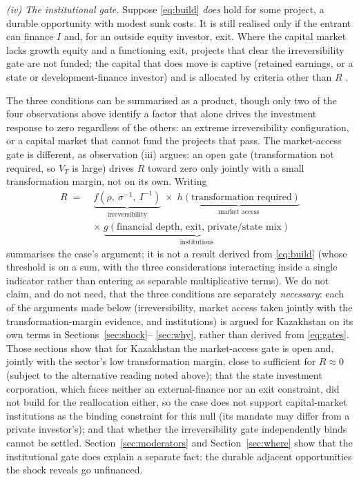 \documentclass[12pt]{article}
\begin{document}
\emph{(iv) The institutional gate.} Suppose \eqref{eq:build} \emph{does} hold for some
project, a durable opportunity with modest sunk costs. It is still realised only if the
entrant can finance $I$ and, for an outside equity investor, exit. Where the capital market
lacks growth equity and a functioning exit, projects that clear the irreversibility gate are
not funded; the capital that does move is captive (retained earnings, or a state or
development-finance investor) and is allocated by criteria other than $R$
\citep{khanna1997,khannapalepu2000,rajanzingales1998}.

The three conditions can be summarised as a product, though only two of the four observations
above identify a factor that alone drives the investment response to zero regardless of the
others: an extreme irreversibility configuration, or a capital market that cannot fund the
projects that pass. The market-access gate is different, as observation (iii) argues: an open
gate (transformation not required, so $V_T$ is large) drives $R$ toward zero only jointly with
a small transformation margin, not on its own. Writing
\begin{equation}
\begin{aligned}
R \;=\;& \underbrace{f\!\left(\rho,\ \sigma^{-1},\ I^{-1}\right)}_{\text{irreversibility}}
\;\times\; \underbrace{h(\text{transformation required})}_{\text{market access}} \\[2pt]
&\times\; \underbrace{g(\text{financial depth, exit, private/state mix})}_{\text{institutions}}
\end{aligned}
\label{eq:gates}
\end{equation}
summarises the case's argument; it is not a result derived from \eqref{eq:build} (whose
threshold is on a sum, with the three considerations interacting inside a single indicator
rather than entering as separable multiplicative terms). We do not claim, and do not need,
that the three conditions are separately \emph{necessary}: each of the arguments made below (irreversibility, market access taken jointly with the transformation-margin evidence, and
institutions) is argued for Kazakhstan on its own terms in Sections~\ref{sec:shock}--%
\ref{sec:why}, rather than derived from \eqref{eq:gates}. Those sections show that for
Kazakhstan the market-access gate is open and, jointly with the sector's low transformation
margin, close to sufficient for $R \approx 0$ (subject to the alternative reading noted above);
that the state investment corporation, which faces neither an external-finance nor an exit constraint, did not build for the reallocation either, so the case does not support capital-market institutions as the binding constraint for this null (its mandate may differ from a private investor's); and that whether the irreversibility gate
independently binds cannot be settled. Section~\ref{sec:moderators} and Section~\ref{sec:where}
show that the institutional gate does explain a separate fact: the durable adjacent
opportunities the shock reveals go unfinanced.
\end{document}
